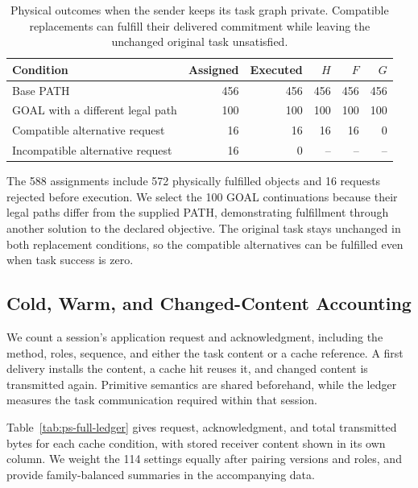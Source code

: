 \documentclass[sigconf,nonacm,balance=false]{aamas}
\newcommand{\tabstyle}{\small\setlength{\tabcolsep}{3pt}\renewcommand{\arraystretch}{1.10}}
\begin{document}
\begin{table}[!htbp]
\centering\tabstyle
\caption{Physical outcomes when the sender keeps its task graph private. Compatible replacements can fulfill their delivered commitment while leaving the unchanged original task unsatisfied.}
\label{tab:ps-physical-supp}
\begin{tabular}{@{}lrrrrr@{}}
\toprule
Condition & Assigned & Executed & $H$ & $F$ & $G$\\
\midrule
Base PATH & 456 & 456 & 456 & 456 & 456\\
GOAL with a different legal path & 100 & 100 & 100 & 100 & 100\\
Compatible alternative request & 16 & 16 & 16 & 16 & 0\\
Incompatible alternative request & 16 & 0 & -- & -- & --\\
\bottomrule
\end{tabular}
\end{table}

The 588 assignments include 572 physically fulfilled objects and 16 requests rejected before execution. We select the 100 GOAL continuations because their legal paths differ from the supplied PATH, demonstrating fulfillment through another solution to the declared objective. The original task stays unchanged in both replacement conditions, so the compatible alternatives can be fulfilled even when task success is zero.

\subsection{Cold, Warm, and Changed-Content Accounting}
We count a session's application request and acknowledgment, including the method, roles, sequence, and either the task content or a cache reference. A first delivery installs the content, a cache hit reuses it, and changed content is transmitted again. Primitive semantics are shared beforehand, while the ledger measures the task communication required within that session.

Table~\ref{tab:ps-full-ledger} gives request, acknowledgment, and total transmitted bytes for each cache condition, with stored receiver content shown in its own column. We weight the 114 settings equally after pairing versions and roles, and provide family-balanced summaries in the accompanying data.
\end{document}
